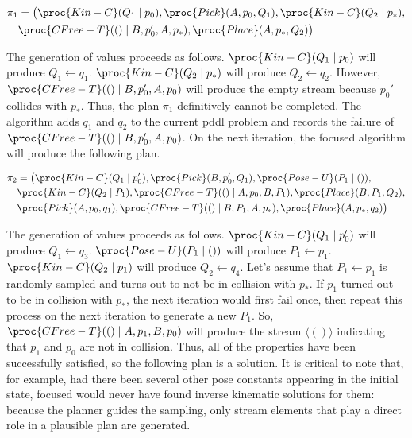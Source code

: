 \documentclass[letterpaper]{article} %
\theoremstyle{plain}\newtheorem{thm}{Theorem}
\theoremstyle{definition}\newtheorem{defn}{Definition}
\theoremstyle{plain}\newtheorem{lem}{Lemma}
\theoremstyle{plain}\newtheorem{cor}{Corollary}
\newcommand{\pddl}{{\sc pddl}}
\newcommand{\focused}{focused}
\begin{document}
\begin{footnotesize}
\begin{align*}
\pi_1 &=  \big(\proc{Kin-C}(Q_1 \mid p_0), \proc{Pick}(A, p_0, Q_1), \proc{Kin-C}(Q_2 \mid p_*), \\
& \proc{CFree-T}(() \mid B, p_0', A, p_*), \proc{Place}(A, p_*, Q_2)\big)
\end{align*}
\end{footnotesize}

The generation of values proceeds as follows.
$\proc{Kin-C}(Q_1 \mid p_0)$ will produce $Q_1 \leftarrow
q_1$. $\proc{Kin-C}(Q_2 \mid p_*)$ will produce $Q_2 \leftarrow
q_2$. However, $\proc{CFree-T}(() \mid B, p_0', A, p_0)$ will produce the
empty stream because $p_0'$ collides with $p_*$. Thus, the plan
$\pi_1$ definitively cannot be completed. The algorithm adds $q_1$ and
$q_2$ to the current \pddl{} problem and records the failure of
$\proc{CFree-T}(() \mid B, p_0', A, p_0)$. 
On the next iteration, the \focused{} algorithm will produce the
following plan. 

\begin{footnotesize}
\begin{align*}
\pi_2 &=  \big(\proc{Kin-C}(Q_1 \mid p_0'), \proc{Pick}(B, p_0', Q_1), \proc{Pose-U}(P_1 \mid ()), \\
& \proc{Kin-C}(Q_2 \mid P_1), \proc{CFree-T}(() \mid A, p_0, B, P_1), \proc{Place}(B, P_1, Q_2), \\
& \proc{Pick}(A, p_0, q_1), \proc{CFree-T}(() \mid B, P_1, A, p_*), \proc{Place}(A, p_*, q_2) \big)
\end{align*}
\end{footnotesize}

The generation of values proceeds as follows.
$\proc{Kin-C}(Q_1 \mid p_0')$ will produce $Q_1 \leftarrow
q_3$. $\proc{Pose-U}(P_1 \mid ())$ will produce $P_1 \leftarrow p_1$.
$\proc{Kin-C}(Q_2 \mid p_1)$ will produce $Q_2 \leftarrow q_4$.  Let's
assume that $P_1 \leftarrow p_1$ is randomly sampled and turns out to
not be in collision with $p_*$. If $p_1$ turned out to be in collision
with $p_*$, the next iteration would first fail once, then repeat this
process on the next iteration to generate a new $P_1$.  So,
$\proc{CFree-T}(() \mid A, p_1, B, p_0)$ will produce the stream
$\langle () \rangle$ indicating that $p_1$ and $p_0$ are not in
collision.  Thus, all of the properties have been successfully
satisfied, so the following plan is a solution.
It is critical to note that, for example, had there been several other
pose constants appearing in the initial state, \focused{} would never have
found inverse kinematic solutions for them:
because the planner guides the sampling, only stream elements that
play a direct role in a plausible plan are generated.
\end{document}
